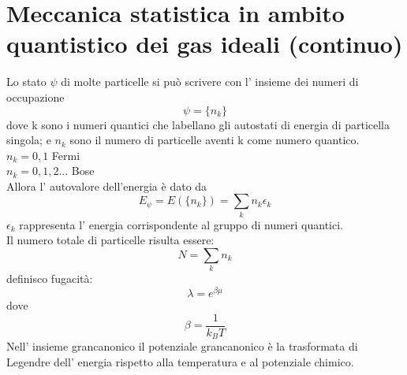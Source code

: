 


%
\section[Meccanica statistica quantistica]{Meccanica statistica in ambito quantistico dei gas ideali (continuo)} %
Lo stato $\psi$ di molte particelle si può scrivere con l' insieme dei numeri di occupazione\\
\begin{equation}
\psi= \{n_{k}\}
\end{equation}
dove k sono i numeri quantici che labellano gli autostati di energia di particella singola; e $n_{k}$ sono il numero di particelle  aventi k come numero quantico.
$n_{k}=0,1$ Fermi\\
$n_{k}=0,1,2...$ Bose\\
Allora l' autovalore dell'energia è dato da
\begin{equation}
E_{\psi}= E(\{n_{k}\})= \sum_{k} n_{k}\epsilon_{k}
\end{equation}
$\epsilon_{k}$ rappresenta l' energia corrispondente al gruppo di numeri quantici.\\
Il numero totale di particelle risulta essere:
\begin{equation}
N=\sum_{k} n_{k}
\end{equation}
definisco fugacità:
\begin{equation}
\lambda=e^{\beta\mu}
\end{equation}
dove
\begin{equation}
\beta=\dfrac{1}{k_{B}T}
\end{equation}
Nell' insieme grancanonico il potenziale grancanonico è la trasformata di Legendre dell' energia rispetto alla temperatura e al potenziale chimico.

